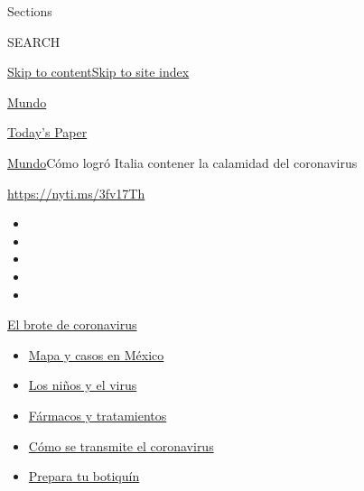 Sections

SEARCH

\protect\hyperlink{site-content}{Skip to
content}\protect\hyperlink{site-index}{Skip to site index}

\href{https://www.nytimes.com/es/section/mundo}{Mundo}

\href{https://myaccount.nytimes.com/auth/login?response_type=cookie\&client_id=vi}{}

\href{https://www.nytimes.com/section/todayspaper}{Today's Paper}

\href{/es/section/mundo}{Mundo}\textbar{}Cómo logró Italia contener la
calamidad del coronavirus

\url{https://nyti.ms/3fv17Th}

\begin{itemize}
\item
\item
\item
\item
\item
\end{itemize}

\href{https://www.nytimes.com/es/spotlight/coronavirus?action=click\&pgtype=Article\&state=default\&region=TOP_BANNER\&context=storylines_menu}{El
brote de coronavirus}

\begin{itemize}
\tightlist
\item
  \href{https://www.nytimes.com/es/interactive/2020/espanol/america-latina/coronavirus-en-mexico.html?action=click\&pgtype=Article\&state=default\&region=TOP_BANNER\&context=storylines_menu}{Mapa
  y casos en México}
\item
  \href{https://www.nytimes.com/es/2020/07/31/espanol/ciencia-y-tecnologia/ninos-contagio-coronavirus.html?action=click\&pgtype=Article\&state=default\&region=TOP_BANNER\&context=storylines_menu}{Los
  niños y el virus}
\item
  \href{https://www.nytimes.com/es/interactive/2020/science/coronavirus-tratamientos-curas.html?action=click\&pgtype=Article\&state=default\&region=TOP_BANNER\&context=storylines_menu}{Fármacos
  y tratamientos}
\item
  \href{https://www.nytimes.com/es/2020/07/06/espanol/ciencia-y-tecnologia/coronavirus-transmision-aire.html?action=click\&pgtype=Article\&state=default\&region=TOP_BANNER\&context=storylines_menu}{Cómo
  se transmite el coronavirus}
\item
  \href{https://www.nytimes.com/es/2020/07/14/espanol/estilos-de-vida/botiquin-medicina-coronavirus.html?action=click\&pgtype=Article\&state=default\&region=TOP_BANNER\&context=storylines_menu}{Prepara
  tu botiquín}
\end{itemize}

